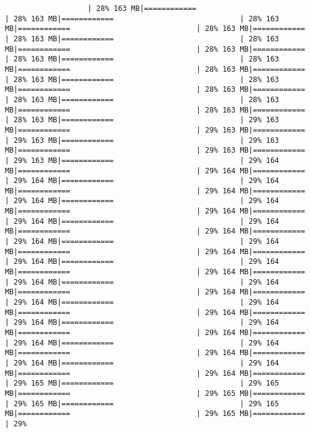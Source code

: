 \documentclass[
]{article}
\begin{document}
\begin{verbatim}
                   | 28% 163 MB|============                             | 28% 163 MB|============                             | 28% 163 MB|============                             | 28% 163 MB|============                             | 28% 163 MB|============                             | 28% 163 MB|============                             | 28% 163 MB|============                             | 28% 163 MB|============                             | 28% 163 MB|============                             | 28% 163 MB|============                             | 28% 163 MB|============                             | 28% 163 MB|============                             | 28% 163 MB|============                             | 28% 163 MB|============                             | 28% 163 MB|============                             | 28% 163 MB|============                             | 28% 163 MB|============                             | 29% 163 MB|============                             | 29% 163 MB|============                             | 29% 163 MB|============                             | 29% 163 MB|============                             | 29% 163 MB|============                             | 29% 163 MB|============                             | 29% 164 MB|============                             | 29% 164 MB|============                             | 29% 164 MB|============                             | 29% 164 MB|============                             | 29% 164 MB|============                             | 29% 164 MB|============                             | 29% 164 MB|============                             | 29% 164 MB|============                             | 29% 164 MB|============                             | 29% 164 MB|============                             | 29% 164 MB|============                             | 29% 164 MB|============                             | 29% 164 MB|============                             | 29% 164 MB|============                             | 29% 164 MB|============                             | 29% 164 MB|============                             | 29% 164 MB|============                             | 29% 164 MB|============                             | 29% 164 MB|============                             | 29% 164 MB|============                             | 29% 164 MB|============                             | 29% 164 MB|============                             | 29% 164 MB|============                             | 29% 164 MB|============                             | 29% 164 MB|============                             | 29% 164 MB|============                             | 29% 164 MB|============                             | 29% 164 MB|============                             | 29% 164 MB|============                             | 29% 164 MB|============                             | 29% 164 MB|============                             | 29% 164 MB|============                             | 29% 165 MB|============                             | 29% 165 MB|============                             | 29% 165 MB|============                             | 29% 165 MB|============                             | 29% 165 MB|============                             | 29% 165 MB|============                             | 29% 
\end{verbatim}
\end{document}
